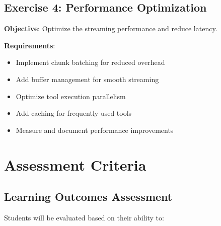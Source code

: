 \documentclass{article}
\begin{document}
\subsection{Exercise 4: Performance Optimization}

\textbf{Objective}: Optimize the streaming performance and reduce latency.

\textbf{Requirements}:
\begin{itemize}
    \item Implement chunk batching for reduced overhead
    \item Add buffer management for smooth streaming
    \item Optimize tool execution parallelism
    \item Add caching for frequently used tools
    \item Measure and document performance improvements
\end{itemize}

\section{Assessment Criteria}

\subsection{Learning Outcomes Assessment}

Students will be evaluated based on their ability to:
\end{document}
